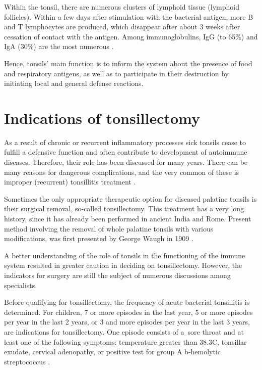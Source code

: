 \documentclass[12pt,a4paper,notitlepage]{report}
\begin{document}
Within the tonsil, there are numerous clusters of lymphoid tissue (lymphoid follicles). Within a few days after stimulation with the bacterial antigen, more B and T lymphocytes are produced, which disappear after about 3 weeks after cessation of contact with the antigen. Among immunoglobulins, IgG (to 65\%) and IgA (30\%) are the most numerous \cite{Niedzielska03}. 

Hence, tonsils' main function is to inform the system about the presence of food and respiratory antigens, as well as to participate in their destruction by initiating local and general defense reactions.


\section{Indications of tonsillectomy}

As a result of chronic or recurrent inflammatory processes sick tonsils cease to fulfill a defensive function and often contribute to development of autoimmune diseases. Therefore, their role has been discussed for many years. There can be many reasons for dangerous complications, and the very common of these is improper (recurrent) tonsillitis treatment \cite{Niedzielska03}.

Sometimes the only appropriate therapeutic option for diseased palatine tonsils is their surgical removal, so-called tonsillectomy. This treatment has a very long history, since it has already been performed in ancient India and Rome. Present method involving the removal of whole palatine tonsils with various modifications, was first presented by George Waugh in 1909 \cite{McNeill60}.

A better understanding of the role of tonsils in the functioning of the immune system resulted in greater caution in deciding on tonsillectomy. However, the indicators for surgery are still the subject of numerous discussions among specialists.

Before qualifying for tonsillectomy, the frequency of acute bacterial tonsillitis is determined. For children, 7 or more episodes in the last year, 5 or more episodes  per year in the last 2 years, or 3 and more episodes per year in the last 3 years, are indications for tonsillectomy. One episode consists of \mbox{a sore} throat and at least one of the following symptoms: temperature greater than 38.3\degree C, tonsillar exudate, cervical adenopathy, or positive test for group A b-hemolytic streptococcus \cite{Baugh11}.
\end{document}
